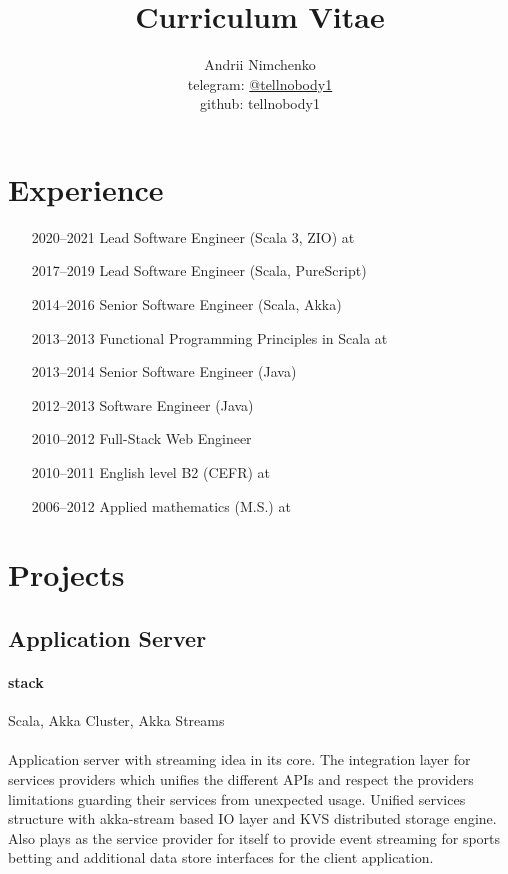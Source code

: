 

\title{Curriculum Vitae}
\author{
  Andrii Nimchenko\\
  telegram: \href{https://t.me/tellnobody1}{@tellnobody1}\\
  github: tellnobody1
}
\maketitle

\section{Experience}
\begin{itemize}
  \item[2020–2021] Lead Software Engineer (Scala 3, ZIO) at 
  \item[2017–2019] Lead Software Engineer (Scala, PureScript)
  \item[2014–2016] Senior Software Engineer (Scala, Akka)
  \item[2013–2013] Functional Programming Principles in Scala at 
  \item[2013–2014] Senior Software Engineer (Java)
  \item[2012–2013] Software Engineer (Java)
  \item[2010–2012] Full-Stack Web Engineer
  \item[2010–2011] English level B2 (CEFR) at 
  \item[2006–2012] Applied mathematics (M.S.) at 
\end{itemize}

\section{Projects}

\subsection{Application Server}
\paragraph{stack} Scala, Akka Cluster, Akka Streams
\paragraph{}
Application server with streaming idea in its core. The integration layer for services providers which unifies the different APIs and respect the providers limitations guarding their services from unexpected usage. Unified services structure with akka-stream based IO layer and KVS distributed storage engine. Also plays as the service provider for itself to provide event streaming for sports betting and additional data store interfaces for the client application.

